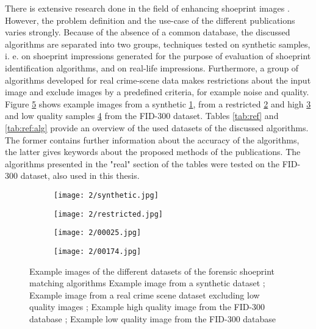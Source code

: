 \documentclass[draft,final]{vutinfth} %
\begin{document}
\par
There is extensive research done in the field of enhancing shoeprint images \cite{rida2019forensic}.
However,  the problem definition and the use-case of the different publications varies strongly.
Because of the absence of a common database, the discussed algorithms are separated into two groups, techniques tested on synthetic samples, i. e. on shoeprint impressions generated for the purpose of evaluation of shoeprint identification algorithms, and on real-life impressions.
Furthermore, a group of algorithms developed for real crime-scene data makes restrictions about the input image and exclude images by a predefined criteria, for example noise and quality.
Figure \ref{fig:rw:database} shows example images from a synthetic \ref{fig:rw:synthetic}, from a restricted \ref{fig:rw:restricted} and high \ref{fig:rw:highFID} and low quality samples \ref{fig:rw:lowFID} from the FID-300 dataset.
Tables \ref{tab:ref} and \ref{tab:ref:alg} provide an overview of the used datasets of the discussed algorithms.
The former contains further information about the accuracy of the algorithms, the latter gives keywords about the proposed methods of the publications.
The algorithms presented in the "real" section of the tables were tested on the FID-300 dataset, also used in this thesis.

\begin{figure}[h]
  \centering
  \begin{subfigure}[t]{0.24\columnwidth}
    \centering
    \texttt{[image: 2/synthetic.jpg]}
    \subcaption{}
    \label{fig:rw:synthetic}
  \end{subfigure}
  \begin{subfigure}[t]{0.24\columnwidth}
    \centering
    \texttt{[image: 2/restricted.jpg]}
    \subcaption{}
    \label{fig:rw:restricted}
  \end{subfigure}
  \begin{subfigure}[t]{0.24\columnwidth}
    \centering
    \texttt{[image: 2/00025.jpg]}
    \subcaption{}
    \label{fig:rw:highFID}
  \end{subfigure}
  \begin{subfigure}[t]{0.24\columnwidth}
    \centering
    \texttt{[image: 2/00174.jpg]}
    \subcaption{}
    \label{fig:rw:lowFID}
  \end{subfigure}
  \caption{Example images of the different datasets of the forensic shoeprint matching algorithms
	 Example image from a synthetic dataset \cite{alizadeh2017automatic};  Example image from a real crime scene dataset excluding low quality images \cite{li2014retrieval};  Example high quality image from the FID-300 database \cite{kortylewski2014unsupervised};  Example low quality image from the FID-300 database \cite{kortylewski2014unsupervised}}
  \label{fig:rw:database}
\end{figure}
\end{document}
